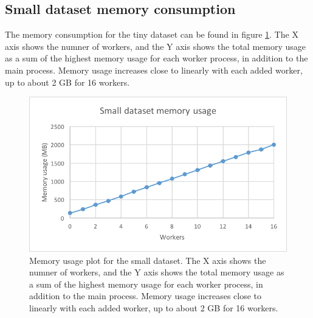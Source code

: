 \subsection{Small dataset memory consumption}
The memory consumption for the tiny dataset can be found in figure \ref{fig:dataset_2_memory}.
The X axis shows the numner of workers, and the Y axis shows the total memory usage as
a sum of the highest memory usage for each worker process, in addition to the main process. Memory usage increases close to linearly with each added worker,
up to about 2 GB for 16 workers.
\begin{figure}[ht]
  \centering
  \includegraphics[width=120mm]{figures/dataset_2/dataset_2_memory.png}
  \caption[Memory usage plot for the small dataset.]{Memory usage plot for the small dataset. The X axis shows the numner of workers, and the Y axis shows the total memory usage as
  a sum of the highest memory usage for each worker process, in addition to the main process. Memory usage increases close to linearly with each added worker,
  up to about 2 GB for 16 workers.}
  \label{fig:dataset_2_memory}
\end{figure}

